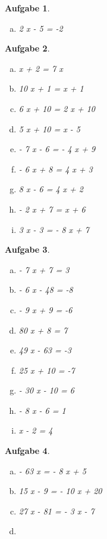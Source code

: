 \documentclass[12pt,fleqn]{article}
\theoremstyle{aufg}
\newtheorem{aufgabe}{Aufgabe}
\theoremstyle{bsp}
\begin{document}
\begin{flushleft}
\begin{aufgabe}
\begin{multicols}{3}
\begin{enumerate}[a)]
\item 
2 x - 5 = -2
\end{enumerate} 
\end{multicols} 
\end{aufgabe} 
\begin{aufgabe} ~ \\ 
\begin{multicols}{3} 
\begin{enumerate}[a)] 
\item 
x + 2 = 7 x
\item 
10 x + 1 = x + 1
\item 
6 x + 10 = 2 x + 10
\item 
5 x + 10 = x - 5
\item 
- 7 x - 6 = - 4 x + 9
\item 
- 6 x + 8 = 4 x + 3
\item 
8 x - 6 = 4 x + 2
\item 
- 2 x + 7 = x + 6
\item 
3 x - 3 = - 8 x + 7
\end{enumerate} 
\end{multicols} 
\end{aufgabe} 
\begin{aufgabe} ~ \\ 
\begin{multicols}{3} 
\begin{enumerate}[a)] 
\item 
- 7 x + 7 = 3
\item 
- 6 x - 48 = -8
\item 
- 9 x + 9 = -6
\item 
80 x + 8 = 7
\item 
49 x - 63 = -3
\item 
25 x + 10 = -7
\item 
- 30 x - 10 = 6
\item 
- 8 x - 6 = 1
\item 
x - 2 = 4
\end{enumerate} 
\end{multicols} 
\end{aufgabe} 
\begin{aufgabe} ~ \\ 
\begin{multicols}{3} 
\begin{enumerate}[a)] 
\item 
- 63 x = - 8 x + 5
\item 
15 x - 9 = - 10 x + 20
\item 
27 x - 81 = - 3 x - 7
\item 

\end{enumerate}
\end{multicols}
\end{aufgabe}
\end{flushleft}
\end{document}

